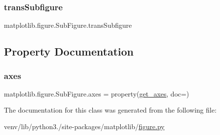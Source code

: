 \subsubsection{\texorpdfstring{trans\+Subfigure}{transSubfigure}}
{\footnotesize\ttfamily matplotlib.\+figure.\+Sub\+Figure.\+trans\+Subfigure}



\subsection{Property Documentation}
\mbox{\label{classmatplotlib_1_1figure_1_1SubFigure_a22811119cafa5097791ece96e30fbb67}} 
\subsubsection{\texorpdfstring{axes}{axes}}
{\footnotesize\ttfamily matplotlib.\+figure.\+Sub\+Figure.\+axes = property(\hyperlink{classmatplotlib_1_1figure_1_1SubFigure_ad68fb8445ae699f76a7e98b6e60b4aa4}{get\+\_\+axes}, doc=)\hspace{0.3cm}{\ttfamily [static]}}



The documentation for this class was generated from the following file\+:\begin{DoxyCompactItemize}
\item 
venv/lib/python3./site-\/packages/matplotlib/\hyperlink{figure_8py}{figure.\+py}\end{DoxyCompactItemize}
